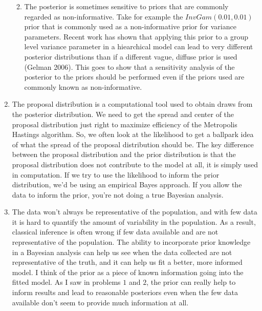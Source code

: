 \documentclass[12pt]{article}\usepackage[]{graphicx}\usepackage[]{color}
\newenvironment{knitrout}{}{} %
\begin{document}
\begin{enumerate}
\begin{enumerate}
\begin{knitrout}
\end{knitrout}

\item The posterior is sometimes sensitive to priors that are commonly regarded as non-informative. Take for example the $InvGam(0.01, 0.01)$ prior that is commonly used as a non-informative prior for variance parameters. Recent work has shown that applying this prior to a group level variance parameter in a hiearchical model can lead to very different posterior distributions than if a different vague, diffuse prior is used (Gelman 2006). This goes to show that a sensitivity analysis of the posterior to the priors should be performed even if the priors used are commonly known as non-informative.

\end{enumerate}

\item The proposal distribution is a computational tool used to obtain draws from the posterior distribution. We need to get the spread and center of the proposal distribution just right to maximize efficiency of the Metropolis Hastings algorithm. So, we often look at the likelihood to get a ballpark idea of what the spread of the proposal distribution should be. The key difference between the proposal distribution and the prior distribution is that the proposal distribution does not contribute to the model at all, it is simply used in computation. If we try to use the likelihood to inform the prior distribution, we'd be using an empirical Bayes approach. If you allow the data to inform the prior, you're not doing a true Bayesian analysis.

\item The data won't always be representative of the population, and with few data it is hard to quantify the amount of variability in the population. As a result, classical inference is often wrong if few data available and are not representative of the population. The ability to incorporate prior knowledge in a Bayesian analysis can help us see when the data collected are not representative of the truth, and it can help us fit a better, more informed model. I think of the prior as a piece of known information going into the fitted model. As I saw in problems $1$ and $2$, the prior can really help to inform results and lead to reasonable posteriors even when the few data available don't seem to provide much information at all.

\end{enumerate}
\end{document}
